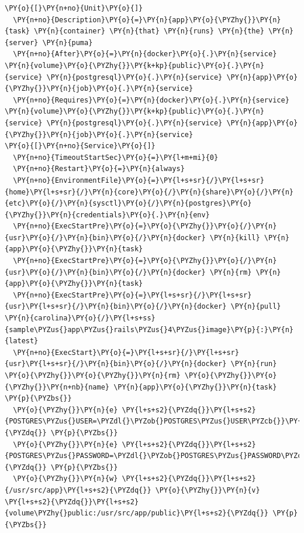 \begin{codelisting}
\label{code:app-task.service}
\begin{Verbatim}[fontsize=\relsize{-2.5},fontseries=b,commandchars=\\\{\}]
\PY{o}{[}\PY{n+no}{Unit}\PY{o}{]} 
  \PY{n+no}{Description}\PY{o}{=}\PY{n}{app}\PY{o}{\PYZhy{}}\PY{n}{task} \PY{n}{container} \PY{n}{that} \PY{n}{runs} \PY{n}{the} \PY{n}{server} \PY{n}{puma}
  \PY{n+no}{After}\PY{o}{=}\PY{n}{docker}\PY{o}{.}\PY{n}{service} \PY{n}{volume}\PY{o}{\PYZhy{}}\PY{k+kp}{public}\PY{o}{.}\PY{n}{service} \PY{n}{postgresql}\PY{o}{.}\PY{n}{service} \PY{n}{app}\PY{o}{\PYZhy{}}\PY{n}{job}\PY{o}{.}\PY{n}{service}
  \PY{n+no}{Requires}\PY{o}{=}\PY{n}{docker}\PY{o}{.}\PY{n}{service} \PY{n}{volume}\PY{o}{\PYZhy{}}\PY{k+kp}{public}\PY{o}{.}\PY{n}{service} \PY{n}{postgresql}\PY{o}{.}\PY{n}{service} \PY{n}{app}\PY{o}{\PYZhy{}}\PY{n}{job}\PY{o}{.}\PY{n}{service}
\PY{o}{[}\PY{n+no}{Service}\PY{o}{]} 
  \PY{n+no}{TimeoutStartSec}\PY{o}{=}\PY{l+m+mi}{0}
  \PY{n+no}{Restart}\PY{o}{=}\PY{n}{always} 
  \PY{n+no}{EnvironmentFile}\PY{o}{=}\PY{l+s+sr}{/}\PY{l+s+sr}{home}\PY{l+s+sr}{/}\PY{n}{core}\PY{o}{/}\PY{n}{share}\PY{o}{/}\PY{n}{etc}\PY{o}{/}\PY{n}{sysctl}\PY{o}{/}\PY{n}{postgres}\PY{o}{\PYZhy{}}\PY{n}{credentials}\PY{o}{.}\PY{n}{env}
  \PY{n+no}{ExecStartPre}\PY{o}{=}\PY{o}{\PYZhy{}}\PY{o}{/}\PY{n}{usr}\PY{o}{/}\PY{n}{bin}\PY{o}{/}\PY{n}{docker} \PY{n}{kill} \PY{n}{app}\PY{o}{\PYZhy{}}\PY{n}{task} 
  \PY{n+no}{ExecStartPre}\PY{o}{=}\PY{o}{\PYZhy{}}\PY{o}{/}\PY{n}{usr}\PY{o}{/}\PY{n}{bin}\PY{o}{/}\PY{n}{docker} \PY{n}{rm} \PY{n}{app}\PY{o}{\PYZhy{}}\PY{n}{task}
  \PY{n+no}{ExecStartPre}\PY{o}{=}\PY{l+s+sr}{/}\PY{l+s+sr}{usr}\PY{l+s+sr}{/}\PY{n}{bin}\PY{o}{/}\PY{n}{docker} \PY{n}{pull} \PY{n}{carolina}\PY{o}{/}\PY{l+s+ss}{sample\PYZus{}app\PYZus{}rails\PYZus{}4\PYZus{}image}\PY{p}{:}\PY{n}{latest} 
  \PY{n+no}{ExecStart}\PY{o}{=}\PY{l+s+sr}{/}\PY{l+s+sr}{usr}\PY{l+s+sr}{/}\PY{n}{bin}\PY{o}{/}\PY{n}{docker} \PY{n}{run} \PY{o}{\PYZhy{}}\PY{o}{\PYZhy{}}\PY{n}{rm} \PY{o}{\PYZhy{}}\PY{o}{\PYZhy{}}\PY{n+nb}{name} \PY{n}{app}\PY{o}{\PYZhy{}}\PY{n}{task} \PY{p}{\PYZbs{}}
  \PY{o}{\PYZhy{}}\PY{n}{e} \PY{l+s+s2}{\PYZdq{}}\PY{l+s+s2}{POSTGRES\PYZus{}USER=\PYZdl{}\PYZob{}POSTGRES\PYZus{}USER\PYZcb{}}\PY{l+s+s2}{\PYZdq{}} \PY{p}{\PYZbs{}}
  \PY{o}{\PYZhy{}}\PY{n}{e} \PY{l+s+s2}{\PYZdq{}}\PY{l+s+s2}{POSTGRES\PYZus{}PASSWORD=\PYZdl{}\PYZob{}POSTGRES\PYZus{}PASSWORD\PYZcb{}}\PY{l+s+s2}{\PYZdq{}} \PY{p}{\PYZbs{}}
  \PY{o}{\PYZhy{}}\PY{n}{w} \PY{l+s+s2}{\PYZdq{}}\PY{l+s+s2}{/usr/src/app}\PY{l+s+s2}{\PYZdq{}} \PY{o}{\PYZhy{}}\PY{n}{v} \PY{l+s+s2}{\PYZdq{}}\PY{l+s+s2}{volume\PYZhy{}public:/usr/src/app/public}\PY{l+s+s2}{\PYZdq{}} \PY{p}{\PYZbs{}}

\end{Verbatim}
\end{codelisting}
